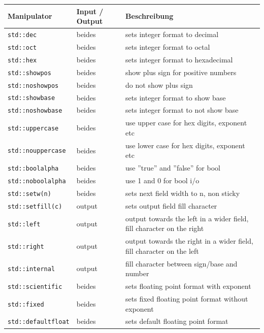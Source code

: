 \begin{table}[h]
	\centering
	\begin{tabu} to \linewidth {l l X}
		\toprule 
		Manipulator & Input / Output & Beschreibung \\
		\midrule
		\lstinline|std::dec| & beides & sets integer format to decimal \\
		\lstinline|std::oct| & beides & sets integer format to octal \\
		\lstinline|std::hex| & beides & sets integer format to hexadecimal \\
		\lstinline|std::showpos| & beides & show plus sign for positive numbers \\
		\lstinline|std::noshowpos| & beides & do not show plus sign \\
		\lstinline|std::showbase| & beides & sets integer format to show base \\
		\lstinline|std::noshowbase| & beides & sets integer format to not show base \\
		\lstinline|std::uppercase| & beides & use upper case for hex digits, exponent etc \\
		\lstinline|std::nouppercase| & beides & use lower case for hex digits, exponent etc \\
		\lstinline|std::boolalpha| & beides & use  ''true''  and  ''false''  for  bool \\
		\lstinline|std::noboolalpha| & beides & use 1 and 0 for bool i/o \\
		\midrule
		\lstinline|std::setw(n)| & beides & sets  next  field  width  to  n,  non sticky \\
		\lstinline|std::setfill(c)| & output & sets output field fill character \\
		\lstinline|std::left| & output & output   towards   the   left   in a wider field, fill character on the right \\
		\lstinline|std::right| & output & output  towards  the  right  in  a wider field, fill character on the left \\
		\lstinline|std::internal| & output & fill character between sign/base and number \\
		\midrule
		\lstinline|std::scientific| & beides & sets  floating  point  format  with exponent \\
		\lstinline|std::fixed| & beides & sets  fixed  floating  point  format without exponent \\
		\lstinline|std::defaultfloat| & beides & sets default floating point format \\

\end{tabu}
\end{table}

